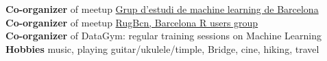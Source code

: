 \documentclass[a4paper, oneside]{scrreprt}
\begin{document}
\noindent\makebox[\linewidth]{\rule{\textwidth}{0.4pt}}

\vspace{0.6cm}


\noindent
\begin{minipage}{0.9\textwidth}
  \noindent\llap{\FA \faCar\ \ }\textbf{Co-organizer} of meetup
  \href{https://www.meetup.com/Grup-destudid-e-machine-learning-de-Barcelona/}
  {Grup d'estudi de machine learning de Barcelona}\\
  \noindent\llap{\FA \faAreaChart\ \ }\textbf{Co-organizer} of meetup
  \href{https://www.meetup.com/RugBcn-Barcelona-R-users-group/}{RugBcn, Barcelona R users group}\\
  \noindent\llap{\FA \faCogs\ \ }\textbf{Co-organizer} of DataGym: regular training sessions on Machine Learning\\
  \noindent\llap{\FA \faMusic\ \ }\textbf{Hobbies} music, playing guitar/ukulele/timple, Bridge, cine, hiking, travel\\
\end{minipage}\hfill
{}

\ \\
\ \\
\ \\

\noindent\makebox[\linewidth]{\rule{\textwidth}{0.4pt}}
\end{document}
